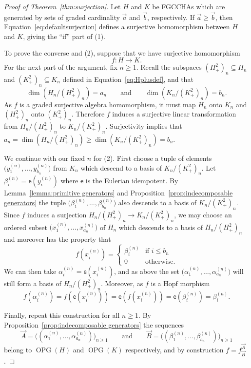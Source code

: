 \documentclass[11pt]{amsart}
\theoremstyle{definition}
\numberwithin{equation}{section}
\newcommand{\FGCCHAs}{\textsf{FGCCHA}s\xspace}
\newcommand{\OPG}{\operatorname{OPG}}
\begin{document}
\begin{proof}[Proof of Theorem~\ref{thm:surjection}]
Let $H$ and $K$ be \FGCCHAs which are generated by sets of graded cardinality $\vec{a}$ and $\vec{b}$, respectively.  
If $\vec{a} \ge \vec{b}$, then Equation~\eqref{eq:defaultsurjection} defines a surjective homomorphism between $H$ and $K$, giving the ``if'' part of (1).

To prove the converse and (2), suppose that we have surjective homomorphism
\[
f: H \to K.
\]
For the next part of the argument, fix $n \ge 1$.  
Recall the subspaces $(H_{+}^{2})_{n} \subseteq H_{n}$ and $(K_{+}^{2})_{n} \subseteq K_{n}$ defined in Equation~\eqref{eq:Hplusdef}, and that 
\[
\dim(H_{n} / (H^{2}_{+})_{n}) = a_{n}
\qquad\text{and}\qquad
\dim(K_{n} / (K^{2}_{+})_{n}) = b_{n}.
\]
As $f$ is a graded surjective algebra homomorphism, it must map $H_{n}$ onto $K_{n}$ and $(H^{2}_{+})_{n}$ onto $(K^{2}_{+})_{n}$.  
Therefore $f$ induces a surjective linear transformation from $H_{n} / (H_{+}^{2})_{n}$ to $K_{n} / (K_{+}^{2})_{n}$.  
Surjectivity implies that $a_{n} = \dim(H_{n} / (H_{+}^{2})_{n}) \ge \dim(K_{n} / (K_{+}^{2})_{n})  = b_{n}$.


We continue with our fixed $n$ for (2).  
First choose a tuple of elements $\big( y^{(n)}_{1}, \ldots, y^{(n)}_{b_{n}} \big)$ from $K_{n}$ which descend to a basis of $K_{n} / (K_{+}^{2})_{n}$.
Let $\beta_{i}^{(n)} = \mathsf{e}(y_{i}^{(n)})$ where $\mathsf{e}$ is the 
Eulerian idempotent. 
By Lemma~\ref{lemma:primitive generators} and Proposition~\ref{prop:indecomposable generators} the tuple $\big( \beta^{(n)}_{1}, \ldots, \beta^{(n)}_{b_{n}} \big)$ also descends to a basis of $K_{n} / (K^{2}_{+})_{n}$.  
Since $f$ induces a surjection $H_{n} / (H^{2}_{+})_{n} \to K_{n} / (K^{2}_{+})_{n}$, we may choose an ordered subset $\big( x^{(n)}_{1}, \ldots, x^{(n)}_{a_{n}} \big)$ of $H_{n}$ which descends to a basis of $H_{n}/(H^{2}_{+})_{n}$ and moreover has the property that
\[
f(x^{(n)}_{i}) = \begin{cases} \beta^{(n)}_{i} & \text{if $i \le b_{n}$} \\ 0 & \text{otherwise.} \end{cases}
\]
We can then take $\alpha_{i}^{(n)} = \mathsf{e}(x_{i}^{(n)})$, and as above the set $\big( \alpha^{(n)}_{1}, \ldots, \alpha^{(n)}_{a_{n}} \big)$ will still form a basis of $H_{n} / (H^{2}_{+})_{n}$.  Moreover, as $f$ is a Hopf morphism 
\[
f(\alpha_{i}^{(n)}) = f( \mathsf{e}(x_{i}^{(n)})) = \mathsf{e}(f( x_{i}^{(n)})) = \mathsf{e}(\beta_{i}^{(n)}) = \beta_{i}^{(n)}.
\]

Finally, repeat this construction for all $n \ge 1$.  By Proposition~\ref{prop:indecomposable generators} the sequences 
\[
\vec{A} = \big( (\alpha_{1}^{(n)}, \ldots, \alpha_{a_{n}}^{(n)}) \big)_{n \ge 1}
\qquad\text{and}\qquad
\vec{B} = \big( (\beta_{1}^{(n)}, \ldots, \beta_{b_{n}}^{(n)}) \big)_{n \ge 1}
\]
belong to $\OPG(H)$ and $\OPG(K)$ respectively, and by construction $f = f^{\vec{A}}_{\vec{B}}$.
\end{proof}
\end{document}
